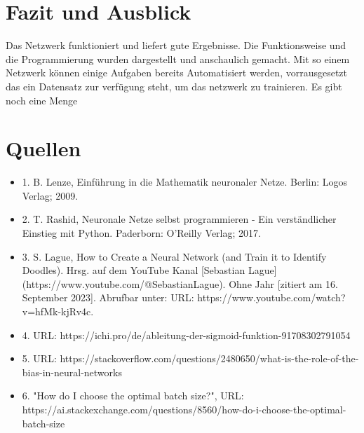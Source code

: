 \documentclass[12pt]{article}
\begin{document}
\cleardoublepage
\section{Fazit und Ausblick}
Das Netzwerk funktioniert und liefert gute Ergebnisse. Die Funktionsweise und die Programmierung wurden dargestellt und anschaulich gemacht.
Mit so einem Netzwerk können einige Aufgaben bereits Automatisiert werden, vorrausgesetzt das ein Datensatz zur verfügung steht, um das netzwerk zu trainieren.
Es gibt noch eine Menge 


\cleardoublepage
\section{ Quellen}
\begin{itemize}
\item 1. B. Lenze, Einführung in die Mathematik neuronaler Netze. Berlin: Logos Verlag; 2009.
\item 2. T. Rashid, Neuronale Netze selbst programmieren - Ein verständlicher Einstieg mit Python. Paderborn: O’Reilly Verlag; 2017.
\item 3. S. Lague, How to Create a Neural Network (and Train it to Identify Doodles). Hrsg. auf dem YouTube Kanal [Sebastian Lague](https://www.youtube.com/@SebastianLague). Ohne Jahr [zitiert am 16. September 2023]. Abrufbar unter: URL: https://www.youtube.com/watch?v=hfMk-kjRv4c.
\item 4. URL: https://ichi.pro/de/ableitung-der-sigmoid-funktion-91708302791054
\item 5. URL: https://stackoverflow.com/questions/2480650/what-is-the-role-of-the-bias-in-neural-networks
\item 6. "How do I choose the optimal batch size?", URL: https://ai.stackexchange.com/questions/8560/how-do-i-choose-the-optimal-batch-size
\end{itemize}

\cleardoublepage
{}
\listoffigures
\end{document}
